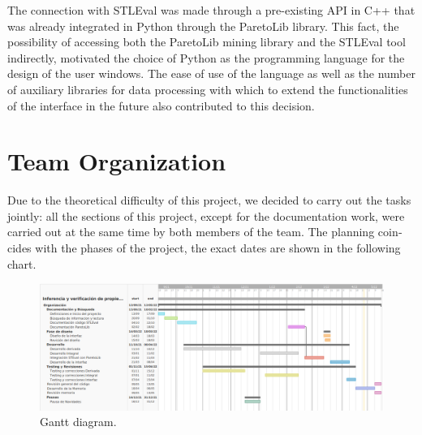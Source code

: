 \begin{otherlanguage}{british}
The connection with STLEval was made through a pre-existing API in C++ that was already integrated in Python through the ParetoLib library. This fact, the possibility of accessing both the ParetoLib mining library and the STLEval tool indirectly, motivated the choice of Python as the programming language for the design of the user windows. The ease of use of the language as well as the number of auxiliary libraries for data processing with which to extend the functionalities of the interface in the future also contributed to this decision.

\section{Team Organization}
Due to the theoretical difficulty of this project, we decided to carry out the tasks jointly: all the sections of this project, except for the documentation work, were carried out at the same time by both members of the team.
The planning coincides with the phases of the project, the exact dates are shown in the following chart.

\begin{figure}
\centering
  \includegraphics[width=.8\linewidth ,angle = 90,scale = 1]{images/gant}
\caption{Gantt diagram.}
\label{fig:gant2}
\end{figure}
\end{otherlanguage}